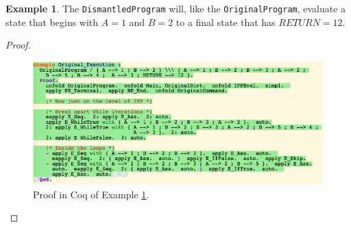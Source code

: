 \documentclass[12pt,notitlepage]{report}
\theoremstyle{plain}
\theoremstyle{definition}
\newtheorem{example}[theo]{Example}
\numberwithin{equation}{section}
\begin{document}
\begin{example}\label{while2}
The \verb$DismantledProgram$ will, like the \verb$OriginalProgram$, evaluate a state that begins with $A=1$ and $B=2$ to a final state that has $RETURN=12$.
\begin{proof}\ \newline
    \noindent
        \begin{figure}[H]
        \centering
        \includegraphics[scale=0.6]{while1.png}
        \caption{Proof in Coq of Example \ref{while2}.}
        \label{fig:while2}
        \end{figure}\qedhere
\end{proof}
\end{example}
\end{document}
